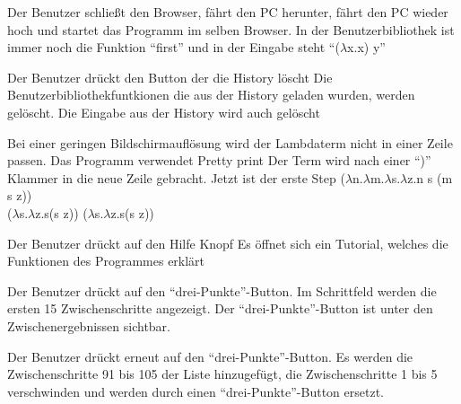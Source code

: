 \documentclass[parskip=full,11pt,twoside]{scrartcl}
\begin{document}
{Der Benutzer schließt den Browser, fährt den PC herunter, fährt den PC wieder hoch und startet das Programm im selben Browser.}
{In der Benutzerbibliothek ist immer noch die Funktion \enquote{first} und in der Eingabe steht \enquote{($\lambda$x.x) y}}

{Der Benutzer drückt den Button der die History löscht}
{Die Benutzerbibliothekfuntkionen die aus der History geladen wurden, werden gelöscht. Die Eingabe aus der History wird auch gelöscht}


{Bei einer geringen Bildschirmauflösung wird der Lambdaterm nicht in einer Zeile passen. Das Programm verwendet Pretty print }
{Der Term wird nach einer \enquote{)} Klammer in die neue Zeile gebracht. Jetzt ist der erste Step \newline ($\lambda$n.$\lambda$m.$\lambda$s.$\lambda$z.n s (m s z))
	\\
	\noindent\hspace*{5mm}
	($\lambda$s.$\lambda$z.s(s z)) ($\lambda$s.$\lambda$z.s(s z)) }

{Der Benutzer drückt auf den Hilfe Knopf}
{Es öffnet sich ein Tutorial, welches die Funktionen des Programmes erklärt}


{Der Benutzer drückt auf den \enquote {drei-Punkte}-Button.}
{Im Schrittfeld werden die ersten 15 Zwischenschritte angezeigt. Der \enquote {drei-Punkte}-Button ist unter den Zwischenergebnissen sichtbar.}

{Der Benutzer drückt erneut auf den \enquote {drei-Punkte}-Button.}
{Es werden die Zwischenschritte 91 bis 105 der Liste hinzugefügt, die Zwischenschritte 1 bis 5 verschwinden und werden durch einen \enquote {drei-Punkte}-Button ersetzt.}
\end{document}

